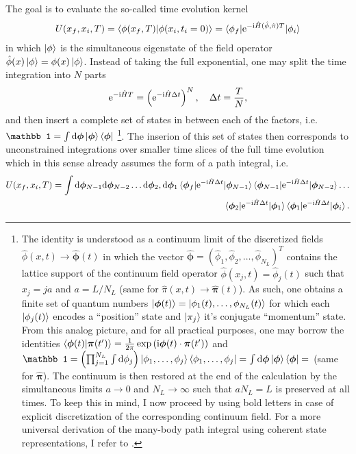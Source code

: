 The goal is to evaluate the so-called time evolution kernel
\begin{align}
    U(x_f,x_i,T) = \braket{\phi(x_f,T)|\phi(x_i,t_i=0)}=\braket{\phi_f|\mathrm e^{-\mathrm i\hat H(\hat\phi,\hat\pi) T}|\phi_i}
\end{align}
in which $\ket{\phi}$ is the simultaneous eigenstate of the field operator $\hat\phi(x)\ket{\phi}=\phi(x)\ket{\phi}$.
Instead of taking the full exponential, one may split the time integration into $N$ parts
\begin{align}
    \mathrm e^{-\mathrm i\hat HT}=\left( \mathrm e^{-\mathrm i\hat H\Delta t} \right)^N
    ,
    \quad
    \Delta t = \frac TN
    ,
\end{align}
and then insert a complete set of states in between each of the factors, i.e. $\mathbb 1=\int\rd\bm\phi\ket{\bm\phi}\bra{\bm\phi}$
\footnote{
    The identity is understood as a continuum limit of the discretized fields $\hat\phi(x,t)\rightarrow{\hat{\bm\phi}}(t)$ in which the vector $\hat{\bm\phi}=(\hat\phi_1,\hat\phi_2,\dots,\hat\phi_{N_L})^T$ contains the lattice support of the continuum field operator $\hat\phi(x_j,t)=\hat\phi_j(t)$ such that $x_j=ja$ and $a=L/N_L$ (same for $\hat\pi(x,t)\rightarrow\hat{\bm\pi}(t)$).
    As such, one obtains a finite set of quantum numbers $\ket{\bm\phi(t)}=\ket{\phi_1(t),\dots,\phi_{N_L}(t)}$ for which each $\ket{\phi_j(t)}$ encodes a ``position'' state and $\ket{\pi_j}$ it's conjugate ``momentum'' state.
    From this analog picture, and for all practical purposes, one may borrow the identities $\braket{\bm\phi(t)|\bm\pi(t')}=\frac1{2\pi}\exp\left( \mathrm i\bm\phi(t)\cdot\bm\pi(t') \right)$ and $\mathbb1=\brlr{\prod_{j=1}^{N_L}\int\rd\phi_j}\ket{\phi_1,\dots,\phi_j}\bra{\phi_1,\dots,\phi_j}=\int\rd\bm\phi\ket{\bm\phi}\bra{\bm\phi}=$ (same for $\hat{\bm\pi}$).
    The continuum is then restored at the end of the calculation by the simultaneous limits $a\rightarrow0$ and $N_L\rightarrow\infty$ such that $aN_L=L$ is preserved at all times.
    To keep this in mind, I now proceed by using bold letters in case of explicit discretization of the corresponding continuum field.
    For a more universal derivation of the many-body path integral using coherent state representations, I refer to \cite{AltlandSimons2010}.
}.
The inserion of this set of states then corresponds to unconstrained integrations over smaller time slices of the full time evolution which in this sense already assumes the form of a path integral, i.e.
\begin{align}
    U(x_f,x_i,T) =
    \int{\mathrm d{\bm\phi}_{N-1}\mathrm d{\bm\phi}_{N-2}\dots\mathrm d{\bm\phi}_2,\mathrm d{\bm\phi}_1}
    \braket{\bm\phi_f|\mathrm e^{-\mathrm i\hat H\Delta t}|\bm\phi_{N-1}}
    \braket{\bm\phi_{{N-1}}|\mathrm e^{-\mathrm i\hat H\Delta t}|\bm\phi_{{N-2}}}
    \dots
    \nonumber\\
    \braket{\bm\phi_{2}|\mathrm e^{-\mathrm i\hat H\Delta t}|\bm\phi_{1}}
    \braket{\bm\phi_{1}|\mathrm e^{-\mathrm i\hat H\Delta t}|\bm\phi_i}.
\end{align}
